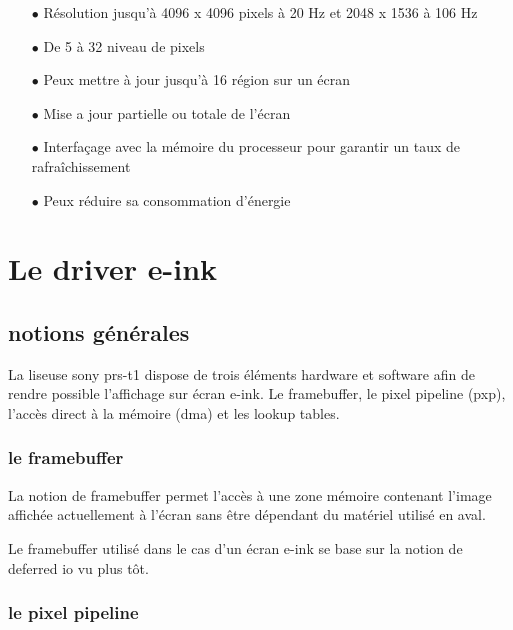 \begin{itemize}
	\item[$\bullet$] Résolution jusqu'à 4096 x 4096 pixels à 20 Hz et 2048 x 1536 à 106 Hz
	\item[$\bullet$] De 5 à 32 niveau de pixels
	\item[$\bullet$] Peux mettre à jour jusqu'à 16 région sur un écran
	\item[$\bullet$] Mise a jour partielle ou totale de l'écran 
	\item[$\bullet$] Interfaçage avec la mémoire du processeur pour garantir un taux de rafraîchissement
	\item[$\bullet$] Peux réduire sa consommation d'énergie
\end{itemize}


\section{Le driver e-ink}

\subsection{notions générales}
La liseuse sony prs-t1 dispose de trois éléments hardware et software afin 
de rendre possible l'affichage sur écran e-ink. Le framebuffer, le pixel pipeline (pxp), l'accès direct à la mémoire (dma) et les lookup tables.

\subsubsection{le framebuffer}

La notion de framebuffer permet l'accès à une zone mémoire contenant l'image affichée actuellement à l'écran sans être dépendant  du matériel utilisé en aval.

Le framebuffer utilisé dans le cas d'un écran e-ink se base sur la notion de deferred io vu plus tôt.

\subsubsection{le pixel pipeline}

